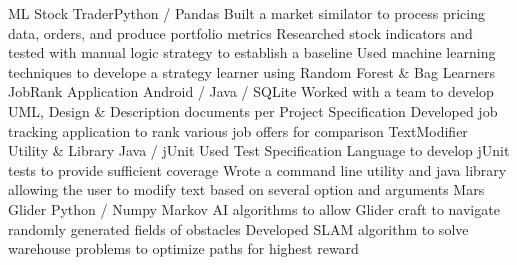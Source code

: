 %
%
%
%
%
\justifiedsubsection%
{ML Stock Trader}{Python / Pandas}
%
\workitemsThree%
{Built a market similator to process pricing data, orders, and produce portfolio metrics}
{Researched stock indicators and tested with manual logic strategy to establish a baseline}
{Used machine learning techniques to develope a strategy learner using Random Forest \& Bag Learners}
%
%
%
%
\justifiedsubsection%
{JobRank Application}
{Android / Java / SQLite}
%
\workitemsTwo%
{Worked with a team to develop UML, Design \& Description documents per Project Specification}
{Developed job tracking application to rank various job offers for comparison}
%
%
%
%
\justifiedsubsection%
{TextModifier Utility \& Library}
{Java / jUnit}
%
\workitemsTwo%
{Used Test Specification Language to develop jUnit tests to provide sufficient coverage}
{Wrote a command line utility and java library allowing the user to modify text based on several option and arguments}
%
%
%
%
\justifiedsubsection%
{Mars Glider}
{Python / Numpy}
%
\workitemsTwo%
{Markov AI algorithms to allow Glider craft to navigate randomly generated fields of obstacles}
{Developed SLAM algorithm to solve warehouse problems to optimize paths for highest reward}
%
%
%
%